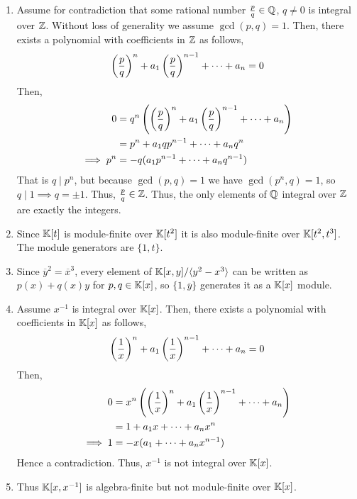 \documentclass[Notebook.tex]{subfiles}
\begin{document}
\begin{solution}
    \bbni
    \begin{enumerate}
        \item Assume for contradiction that some rational number $\frac{p}{q} \in \mathbb Q$, $q \neq 0$ is integral over $\mathbb Z$. Without loss of generality we assume $\gcd(p, q) = 1$. Then, there exists a polynomial with coefficients in $\mathbb Z$ as follows, 
        \[\left(\frac{p}{q}\right)^n + a_1\left(\frac{p}{q}\right)^{n-1} + \cdots + a_n = 0\]
        Then, 
        \begin{align*}
            0 &= q^n \left(\left(\frac{p}{q}\right)^n + a_1\left(\frac{p}{q}\right)^{n-1} + \cdots + a_n\right) \\ 
            &= p^n + a_1 qp^{n-1} + \cdots + a_nq^n \\ 
        \implies p^n &= - q(a_1 p^{n-1} + \cdots + a_nq^{n-1})  \\
        \end{align*}
        That is $q \mid p^n$, but because $\gcd(p, q) = 1$ we have $\gcd(p^n, q) = 1$, so $q \mid 1 \implies q = \pm 1$. Thus, $\frac{p}{q} \in \mathbb Z$. Thus, the only elements of $\mathbb Q$ integral over $\mathbb Z$ are exactly the integers. 

        \item Since $\mathbb K[t]$ is module-finite over $\mathbb K[t^2]$ it is also module-finite  over $\mathbb K[t^2, t^3]$. The module generators are $\{1, t\}$. 
        
        \item Since $\overline{y}^2 = \overline{x}^3$, every element of $\mathbb K[x, y]/\langle y^2 - x^3 \rangle$ can be written as $p(x) + q(x)y$ for $p, q \in \mathbb K[x]$, so $\{1, \overline{y}\}$ generates it as a $\mathbb K[x]$ module. 
        
        \item Assume $x^{-1}$ is integral over $\mathbb K[x]$. Then, there exists a polynomial with coefficients in $\mathbb K[x]$ as follows, 
        \[\left(\frac{1}{x}\right)^n + a_1\left(\frac{1}{x}\right)^{n-1} + \cdots + a_n = 0\]
         Then, 
        \begin{align*}
            0 &= x^n \left(\left(\frac{1}{x}\right)^n + a_1\left(\frac{1}{x}\right)^{n-1} + \cdots + a_n\right) \\ 
            &= 1 + a_1 x + \cdots + a_nx^n \\ 
        \implies 1 &= - x(a_1 + \cdots + a_n x^{n-1}) 
        \end{align*}
        Hence a contradiction. Thus, $x^{-1}$ is not integral over $\mathbb K[x]$. 

        \item Thus $\mathbb K[x, x^{-1}]$ is algebra-finite but not module-finite over $\mathbb K[x]$. 
    \end{enumerate}
\end{solution}
\end{document}
